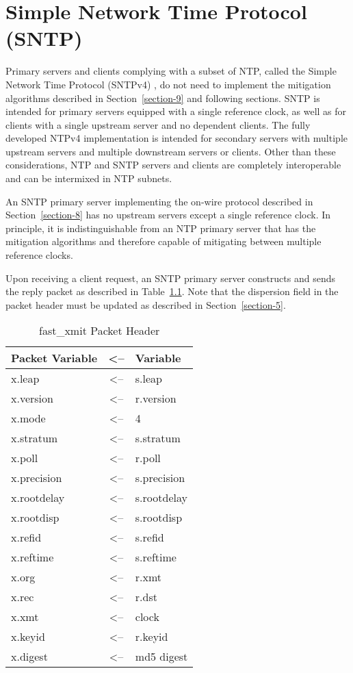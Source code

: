 \chapter{Simple Network Time Protocol (SNTP)}
\label{section-14}

Primary servers and clients complying with a subset of NTP, called
the Simple Network Time Protocol (SNTPv4) \cite{RFC4330}, do not need to
implement the mitigation algorithms described in Section~\ref{section-9} and
following sections. SNTP is intended for primary servers equipped
with a single reference clock, as well as for clients with a single
upstream server and no dependent clients. The fully developed NTPv4
implementation is intended for secondary servers with multiple
upstream servers and multiple downstream servers or clients. Other
than these considerations, NTP and SNTP servers and clients are
completely interoperable and can be intermixed in NTP subnets.

An SNTP primary server implementing the on-wire protocol described in
Section~\ref{section-8} has no upstream servers except a single reference clock.
In principle, it is indistinguishable from an NTP primary server that
has the mitigation algorithms and therefore capable of mitigating
between multiple reference clocks.

Upon receiving a client request, an SNTP primary server constructs
and sends the reply packet as described in Table~\ref{fast_xmit_packet_header}. Note that the
dispersion field in the packet header must be updated as described in
Section~\ref{section-5}.

\begin{table}[htb]
\center
\begin{tabular}{| l | c | l |}
\hline
Packet Variable & <-- & Variable \\
\hline
\hline
x.leap      & <-- & s.leap      \\
x.version   & <-- & r.version   \\
x.mode      & <-- & 4           \\
x.stratum   & <-- & s.stratum   \\
x.poll      & <-- & r.poll      \\
x.precision & <-- & s.precision \\
x.rootdelay & <-- & s.rootdelay \\
x.rootdisp  & <-- & s.rootdisp  \\
x.refid     & <-- & s.refid     \\
x.reftime   & <-- & s.reftime   \\
x.org       & <-- & r.xmt       \\
x.rec       & <-- & r.dst       \\
x.xmt       & <-- & clock       \\
x.keyid     & <-- & r.keyid     \\
x.digest    & <-- & md5 digest  \\
\hline
\end{tabular}
\caption{fast\_xmit Packet Header}
\label{fast_xmit_packet_header}
\end{table}

